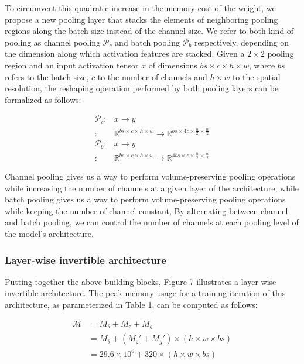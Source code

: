 \documentclass[twocolumn]{bmcart}
\begin{document}
To circumvent this quadratic increase in the memory cost of the weight, 
we propose a new pooling layer that stacks the elements of neighboring pooling regions along the batch size instead of the channel size. 
We refer to both kind of pooling as channel pooling $\mathcal{P}_c$ and batch pooling $\mathcal{P}_b$ respectively, 
depending on the dimension along which activation features are stacked.
Given a $2 \times 2$ pooling region and an input activation tensor $x$ of dimensions $bs \times c \times h \times w$, 
where $bs$ refers to the batch size, $c$ to the number of channels and $h \times w$ to the spatial resolution, 
the reshaping operation performed by both pooling layers can be formalized as follows:

\begin{subequations}
\begin{align}
	\mathcal{P}_c :& x \rightarrow y \\
	              :&  \mathbb{R}^{bs \times c \times h \times w}  \rightarrow \mathbb{R}^{bs \times 4c \times \frac{h}{2} \times \frac{w}{2}}\\
	\mathcal{P}_b :& x \rightarrow y \\
                      :&  \mathbb{R}^{bs \times c \times h \times w}  \rightarrow \mathbb{R}^{4bs \times c \times \frac{h}{2} \times \frac{w}{2}}
\end{align}
\end{subequations}

Channel pooling gives us a way to perform volume-preserving pooling operations while increasing the number of channels at a given layer of the architecture,
while batch pooling gives us a way to perform volume-preserving pooling operations while keeping the number of channel constant, 
By alternating between channel and batch pooling, we can control the number of channels at each pooling level of the model's architecture.

\subsubsection{Layer-wise invertible architecture}

Putting together the above building blocks, Figure 7 illustrates a layer-wise invertible architecture.
The peak memory usage for a training iteration of this architecture, as parameterized in Table 1, can be computed as follows:

\begin{subequations}
\begin{align}
\mathcal{M} &= M_{\theta} + M_{z} + M_{g} \\
            &= M_{\theta} + (M_z' + M_{g}') \times (h \times w \times bs) \\
            &= 29.6 \times 10^6 + 320 \times (h \times w \times bs)
\end{align}
\end{subequations}
\end{document}

